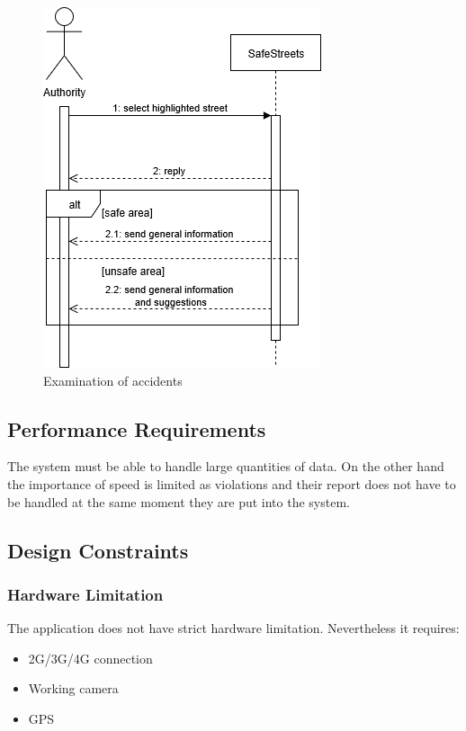 \begin{figure} [H]
    \includegraphics[scale=0.5]{Images/Diagrams/Sequence2.png}
    \caption{\label{fig:Sequence2}Examination of accidents}
\end{figure}

\subsection{Performance Requirements}

The system must be able to handle large quantities of data. 
On the other hand the importance of speed is limited as violations 
and their report does not have to be handled at the same moment 
they are put into the system.

\subsection{Design Constraints}

\subsubsection{Hardware Limitation}

The application does not have strict hardware limitation. 
Nevertheless it requires:

\begin{itemize}
    \item 2G/3G/4G connection
    \item Working camera
    \item GPS
\end{itemize}


